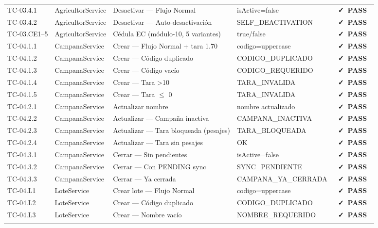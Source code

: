 \documentclass[12pt, a4paper]{article}
\newcommand{\badgePass}{\colorbox{CSuccessBg}{\color{CSuccess}\small\bfseries\ \faCheck\ PASS\ }}
\begin{document}
\begin{longtable}{>{\ttfamily}p{2.1cm} p{2.5cm} p{5.0cm} p{2.5cm} >{\centering\arraybackslash}p{0.9cm}}
  \rowcolor{CBg}
  TC-03.4.1 & AgricultorService & Desactivar --- Flujo Normal & isActive=false & \badgePass \\
  TC-03.4.2 & AgricultorService & Desactivar --- Auto-desactivación & SELF\_DEACTIVATION & \badgePass \\
  \rowcolor{CBg}
  TC-03.CE1--5 & AgricultorService & Cédula EC (módulo-10, 5 variantes) & true/false & \badgePass \\
  \midrule
  TC-04.1.1 & CampanaService & Crear --- Flujo Normal + tara 1.70 & codigo=uppercase & \badgePass \\
  \rowcolor{CBg}
  TC-04.1.2 & CampanaService & Crear --- Código duplicado & CODIGO\_DUPLICADO & \badgePass \\
  TC-04.1.3 & CampanaService & Crear --- Código vacío & CODIGO\_REQUERIDO & \badgePass \\
  \rowcolor{CBg}
  TC-04.1.4 & CampanaService & Crear --- Tara \textgreater 10 & TARA\_INVALIDA & \badgePass \\
  TC-04.1.5 & CampanaService & Crear --- Tara $\leq$ 0 & TARA\_INVALIDA & \badgePass \\
  \rowcolor{CBg}
  TC-04.2.1 & CampanaService & Actualizar nombre & nombre actualizado & \badgePass \\
  TC-04.2.2 & CampanaService & Actualizar --- Campaña inactiva & CAMPANA\_INACTIVA & \badgePass \\
  \rowcolor{CBg}
  TC-04.2.3 & CampanaService & Actualizar --- Tara bloqueada (pesajes) & TARA\_BLOQUEADA & \badgePass \\
  TC-04.2.4 & CampanaService & Actualizar --- Tara sin pesajes & OK & \badgePass \\
  \rowcolor{CBg}
  TC-04.3.1 & CampanaService & Cerrar --- Sin pendientes & isActive=false & \badgePass \\
  TC-04.3.2 & CampanaService & Cerrar --- Con PENDING sync & SYNC\_PENDIENTE & \badgePass \\
  \rowcolor{CBg}
  TC-04.3.3 & CampanaService & Cerrar --- Ya cerrada & CAMPANA\_YA\_CERRADA & \badgePass \\
  TC-04.L1 & LoteService & Crear lote --- Flujo Normal & codigo=uppercase & \badgePass \\
  \rowcolor{CBg}
  TC-04.L2 & LoteService & Crear --- Código duplicado & CODIGO\_DUPLICADO & \badgePass \\
  TC-04.L3 & LoteService & Crear --- Nombre vacío & NOMBRE\_REQUERIDO & \badgePass \\
  \rowcolor{CBg}

\end{longtable}
\end{document}
